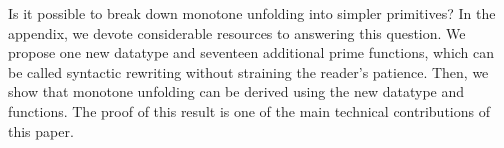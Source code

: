 Is it possible to break down monotone unfolding into simpler primitives?
In the appendix, we devote considerable resources to answering this question. We propose one new  datatype
and seventeen additional prime functions, which can be called syntactic rewriting without straining the reader's patience. Then, we show that monotone unfolding can be derived using   the new datatype and functions. The proof of this result is one of the main technical contributions of this paper.



